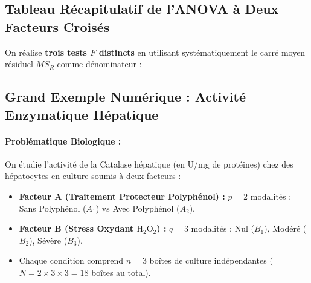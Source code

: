 \documentclass[11pt,a4paper]{article}
\begin{document}
\subsection{Tableau Récapitulatif de l'ANOVA à Deux Facteurs Croisés}
On réalise \textbf{trois tests $F$ distincts} en utilisant systématiquement le carré moyen résiduel $MS_R$ comme dénominateur :
\begin{center}
\end{center}

\subsection{Grand Exemple Numérique : Activité Enzymatique Hépatique}

\paragraph{Problématique Biologique :}
On étudie l'activité de la Catalase hépatique (en U/mg de protéines) chez des hépatocytes en culture soumis à deux facteurs :
\begin{itemize}[leftmargin=*, label=\faCheck]
  \item \textbf{Facteur A (Traitement Protecteur Polyphénol) :} $p = 2$ modalités : Sans Polyphénol ($A_1$) vs Avec Polyphénol ($A_2$).
  \item \textbf{Facteur B (Stress Oxydant $\text{H}_2\text{O}_2$) :} $q = 3$ modalités : Nul ($B_1$), Modéré ($B_2$), Sévère ($B_3$).
  \item Chaque condition comprend $n = 3$ boîtes de culture indépendantes ($N = 2 \times 3 \times 3 = 18$ boîtes au total).
\end{itemize}
\end{document}
